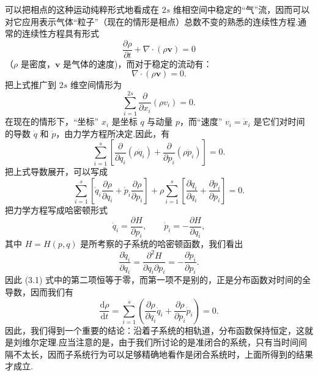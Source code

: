 可以把相点的这种运动纯粹形式地看成在 $2s$ 维相空间中稳定的“气”流，因而可以对它应用表示气体“粒子”（现在的情形是相点）总数不变的熟悉的连续性方程.通常的连续性方程具有形式
\begin{equation*}
  \frac{\partial\rho}{\partial t}+\nabla\cdot(\rho\boldsymbol{v})=0
\end{equation*}
（$\rho$ 是密度，$\boldsymbol{v}$ 是气体的速度)，而对于稳定的流动有：
\begin{equation*}
  \nabla\cdot(\rho\boldsymbol{v})=0.
\end{equation*}
把上式推广到 $2s$ 维空间情形为
\begin{equation*}
  \sum_{i=1}^{2s}\frac{\partial}{\partial x_i}(\rho v_i)=0.
\end{equation*}
在现在的情形下，“坐标” $x_i$ 是坐标 $q$ 与动量 $p$，而“速度” $v_i=\dot{x}_i$ 是它们对时间的导数 $\dot{q}$ 和 $\dot{p}$，由力学方程所决定.因此，有
\begin{equation*}
  \sum_{i=1}^{s}\left[\frac{\partial}{\partial q_i}(\rho\dot{q}_i)
  +\frac{\partial}{\partial p_i}(\rho\dot{p}_i)\right]=0.
\end{equation*}
把上式导数展开，可以写成
\begin{equation}
  \sum_{i=1}^{s}\left[\dot{q}_i\frac{\partial\rho}{\partial q_i}
  +\dot{p}_i\frac{\partial\rho}{\partial p_i}\right]
  +\rho\sum_{i=1}^{s}\left[\frac{\partial\dot{q}_i}{\partial q_i}
  +\frac{\partial\dot{p}_i}{\partial p_i}\right]=0.
\end{equation}
把力学方程写成哈密顿形式
\begin{equation*}
  \dot{q}_i=\frac{\partial H}{\partial p_i},\qquad
  \dot{p}_i=-\frac{\partial H}{\partial q_i},
\end{equation*}
其中 $H=H(p,q)$ 是所考察的子系统的哈密顿函数，我们看出
\begin{equation*}
  \frac{\partial\dot{q}_i}{\partial q_i}
  =\frac{\partial^2 H}{\partial q_i\partial p_i}
  =-\frac{\partial\dot{p}_i}{\partial p_i}.
\end{equation*}
因此 (3.1) 式中的第二项恒等于零，而第一项不是别的，正是分布函数对时间的全导数，因而我们有
\begin{equation}
  \frac{\mathrm{d}\rho}{\mathrm{d}t}
  =\sum_{i=1}^{s}\left(\frac{\partial\rho}{\partial q_i}\dot{q}_i
  +\frac{\partial\rho}{\partial p_i}\dot{p}_i\right)=0.
\end{equation}
因此，我们得到一个重要的结论：沿着子系统的相轨道，分布函数保持恒定，这就是刘维尔定理.应当注意的是，由于我们所讨论的是准闭合的系统，只有当时间间隔不太长，因而子系统行为可以足够精确地看作是闭合系统时，上面所得到的结果才成立.

